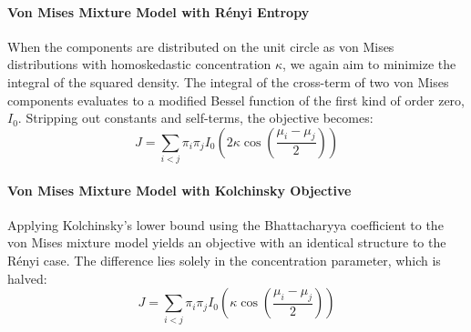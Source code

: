 \paragraph{Von Mises Mixture Model with Rényi Entropy}
When the components are distributed on the unit circle as von Mises distributions with homoskedastic concentration $\kappa$, we again aim to minimize the integral of the squared density. The integral of the cross-term of two von Mises components evaluates to a modified Bessel function of the first kind of order zero, $I_0$. Stripping out constants and self-terms, the objective becomes:
$$ J = \sum_{i < j} \pi_i \pi_j I_0\left( 2\kappa \cos\left( \frac{\mu_i - \mu_j}{2} \right) \right) $$

\paragraph{Von Mises Mixture Model with Kolchinsky Objective}
Applying Kolchinsky's lower bound using the Bhattacharyya coefficient to the von Mises mixture model yields an objective with an identical structure to the Rényi case. The difference lies solely in the concentration parameter, which is halved:
$$ J = \sum_{i < j} \pi_i \pi_j I_0\left( \kappa \cos\left( \frac{\mu_i - \mu_j}{2} \right) \right) $$

